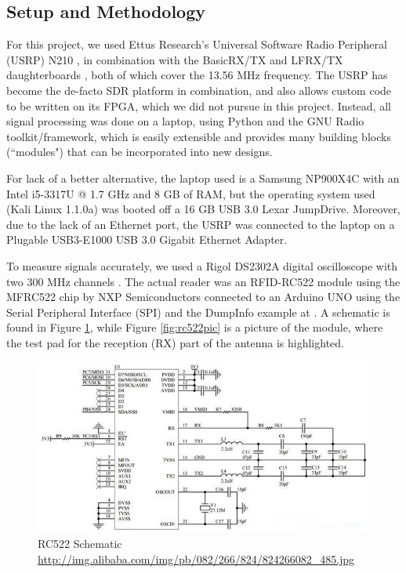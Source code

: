 \documentclass[fleqn,10pt]{SelfArx} %
\begin{document}
\subsection{Setup and Methodology}
\label{subsec:setup}

For this project, we used Ettus Research's Universal Software Radio Peripheral (USRP) N210 \cite{usrp}, in combination with the BasicRX/TX and LFRX/TX daughterboards \cite{daughterboards}, both of which cover the 13.56 MHz frequency. The USRP has become the de-facto SDR platform in combination, and also allows custom code to be written on its FPGA, which we did not pursue in this project. Instead, all signal processing was done on a laptop, using Python and the GNU Radio toolkit/framework, which is easily extensible and provides many building blocks (``modules") that can be incorporated into new designs.

For lack of a better alternative, the laptop used is a Samsung NP900X4C with an Intel i5-3317U @ 1.7 GHz and 8 GB of RAM, but the operating system used (Kali Linux 1.1.0a) was booted off a 16 GB USB 3.0 Lexar JumpDrive. Moreover, due to the lack of an Ethernet port, the USRP was connected to the laptop on a Plugable USB3-E1000 USB 3.0 Gigabit Ethernet Adapter.


To measure signals accurately, we used a Rigol DS2302A digital oscilloscope with two 300 MHz channels \cite{rigol}. The actual reader was an RFID-RC522 module using the MFRC522 chip by NXP Semiconductors \cite{mfrc522} connected to an Arduino UNO using the Serial Peripheral Interface (SPI) and the DumpInfo example at \cite{library}. A schematic is found in Figure \ref{fig:rc522schematic}, while Figure \ref{fig:rc522pic} is a picture of the module, where the test pad for the reception (RX) part of the antenna is highlighted.


\begin{figure}[h]
  \includegraphics[width=\linewidth]{img/rc522schematic}
  \caption{RC522 Schematic \url{http://img.alibaba.com/img/pb/082/266/824/824266082_485.jpg}}
  \label{fig:rc522schematic}
\end{figure}
\end{document}
